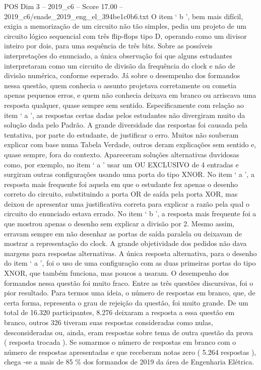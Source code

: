 \begin{textsample}{POS Dim 3 – 2019\_c6 – Score 17.00 – 2019\_c6/enade\_2019\_eng\_el\_394be1c0b6.txt}
O item ‘ b ’, bem mais difícil, exigia a memorização de um circuito não tão simples, pedia um projeto de um circuito lógico sequencial com três flip-flops tipo D, operando como um divisor inteiro por dois, para uma sequência de três bits.
Sobre as possíveis interpretações do enunciado, a única observação foi que alguns estudantes interpretaram como um circuito de divisão da frequência do clock e não de divisão numérica, conforme esperado.
Já sobre o desempenho dos formandos nessa questão, quem conhecia o assunto projetava corretamente ou cometia apenas pequenos erros, e quem não conhecia deixava em branco ou arriscava uma resposta qualquer, quase sempre sem sentido.
Especificamente com relação ao item ‘ a ’, as respostas certas dadas pelos estudantes não divergiram muito da solução dada pelo Padrão.
A grande diversidade das respostas foi causada pela tentativa, por parte do estudante, de justificar o erro.
Muitos não souberam explicar com base numa Tabela Verdade, outros deram explicações sem sentido e, quase sempre, fora do contexto.
Apareceram soluções alternativas duvidosas como, por exemplo, no item ‘ a ’ usar um OU EXCLUSIVO de 4 entradas e surgiram outras configurações usando uma porta do tipo XNOR.
No item ‘ a ’, a resposta mais frequente foi aquela em que o estudante fez apenas o desenho correto do circuito, substituindo a porta OR de saída pela porta XOR, mas deixou de apresentar uma justificativa correta para explicar a razão pela qual o circuito do enunciado estava errado.
No item ‘ b ’, a resposta mais frequente foi a que mostrou apenas o desenho sem explicar a divisão por 2.
Mesmo assim, erravam sempre em não desenhar as portas de saída paralela ou deixavam de mostrar a representação do clock.
A grande objetividade dos pedidos não dava margens para respostas alternativas.
A única resposta alternativa, para o desenho do item ‘ a ’, foi o uso de uma configuração com as duas primeiras portas do tipo XNOR, que também funciona, mas poucos a usaram.
O desempenho dos formandos nessa questão foi muito fraco.
Entre as três questões discursivas, foi o pior resultado.
Para termos uma ideia, o número de respostas em branco, que, de certa forma, representa o grau de rejeição da questão, foi muito grande.
De um total de 16.320 participantes, 8.276 deixaram a resposta a essa questão em branco, outros 326 tiveram suas respostas consideradas como nulas, desconsideradas ou, ainda, eram respostas sobre tema de outra questão da prova ( resposta trocada ).
Se somarmos o número de respostas em branco com o número de respostas apresentadas e que receberam notas zero ( 5.264 respostas ), chega -se a mais de 85 \% dos formandos de 2019 da área de Engenharia Elétrica.

\end{textsample}
